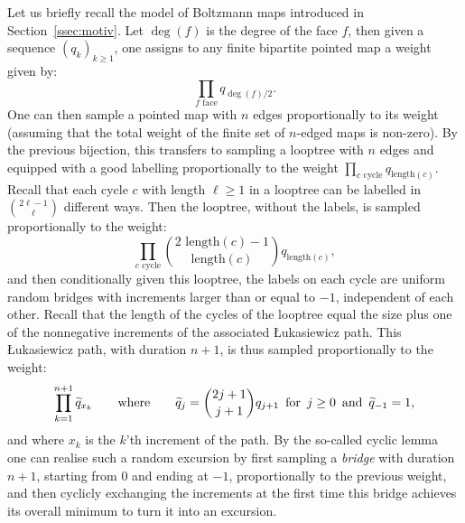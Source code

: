 \documentclass[british, a4paper,11pt]{article}
\numberwithin{equation}{section}
\theoremstyle{definition}
\begin{document}
Let us briefly recall the model of Boltzmann maps introduced in Section~\ref{ssec:motiv}.
Let $\deg(f)$ is the degree of the face $f$, then given a sequence $(q_k)_{k \geq 1}$, one assigns to any finite bipartite pointed map a weight given by: 
\[\prod_{f \text{ face}} q_{\deg(f)/2}.\]
One can then sample a pointed map with $n$ edges proportionally to its weight (assuming that the total weight of the finite set of $n$-edged maps is non-zero).
By the previous bijection, this transfers to sampling a looptree with $n$ edges and equipped with a good labelling proportionally to the weight
$\prod_{c \text{ cycle}} q_{\text{length}(c)}$.
Recall that each cycle $c$ with length $\ell \geq 1$ in a looptree can be labelled in $\binom{2\ell-1}{\ell}$ different ways. Then the looptree, without the labels, is sampled proportionally to the weight:
\[\prod_{c \text{ cycle}} \binom{2\text{ length}(c)-1}{\text{length}(c)} q_{\text{length}(c)},\]
and then conditionally given this looptree, the labels on each cycle are uniform random bridges with increments larger than or equal to $-1$, independent of each other.
Recall that the length of the cycles of the looptree equal the size plus one of the nonnegative increments of the associated {\L}ukasiewicz path. 
This {\L}ukasiewicz path, with duration $n+1$, is thus sampled proportionally to the weight:
\[\prod_{k=1}^{n+1} \widetilde{q}_{x_k}
\qquad\text{where}\qquad
\widetilde{q}_{j} = \binom{2j+1}{j+1} q_{j+1} \enskip\text{for}\enskip j \geq 0 \enskip\text{and}\enskip \widetilde{q}_{-1} = 1,\]
and where $x_k$ is the $k$'th increment of the path.
By the so-called cyclic lemma~\cite[Lemma~6.1]{Pit06} one can realise such a random excursion by first sampling a \emph{bridge} with duration $n+1$, starting from $0$ and ending at $-1$, proportionally to the previous weight, and then cyclicly exchanging the increments at the first time this bridge achieves its overall minimum to turn it into an excursion.
\end{document}
